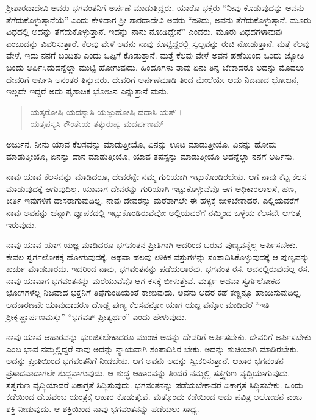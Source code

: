 ಶ್ರೀಶಾರದಾದೇವಿ ಅವರು ಭಗವಂತನಿಗೆ ಅರ್ಪಣೆ ಮಾಡುತ್ತಿದ್ದರು. ಯಾರೊ ಭಕ್ತರು “ನೀವು ಕೊಡುವುದನ್ನು ಅವನು ತೆಗೆದುಕೊಳ್ಳುತ್ತಾನೆಯೆ” ಎಂದು ಕೇಳಿದಾಗ ಶ್ರೀ ಶಾರದಾದೇವಿ ಅವರು “ಹೌದು, ಅವನು ತೆಗೆದುಕೊಳ್ಳುತ್ತಾನೆ. ಮೂರು ವಿಧದಲ್ಲಿ ಅದನ್ನು ತೆಗೆದುಕೊಳ್ಳುತ್ತಾನೆ. ಇದನ್ನು ನಾನು ನೋಡಿದ್ದೇನೆ” ಎಂದರು. ಮೂರು ವಿಧದಗಳಾವುವು ಎಂಬುದನ್ನು ವಿವರಿಸುತ್ತಾರೆ. ಕೆಲವು ವೇಳೆ ಅವನು ನಾವು ಕೊಟ್ಟಿದ್ದರಲ್ಲಿ ಸ್ವಲ್ಪವನ್ನು ರುಚಿ ನೋಡುತ್ತಾನೆ. ಮತ್ತೆ ಕೆಲವು ವೇಳೆ, ಇದು ನನಗೆ ಬಂದಿತು ಎಂದು ಒಪ್ಪಿಗೆ ಕೊಡುತ್ತಾನೆ. ಮತ್ತೆ ಕೆಲವು ವೇಳೆ ಅವನ ಹಣೆಯಿಂದ ಒಂದು ಜ್ಯೋತಿ ಬಂದು ಅರ್ಪಿಸಿದುದನ್ನೆಲ್ಲಾ ಮುಟ್ಟಿ ಹೋಗುವುದು. ಹಿಂದೂಗಳು ತಾವು ಏನು ತಿನ್ನ ಬೇಕಾದರೂ ಅದನ್ನು ಮೊದಲು ದೇವರಿಗೆ ಅರ್ಪಿಸಿ ಅನಂತರ ತಿನ್ನುವರು. ದೇವರಿಗೆ ಅರ್ಪಣೆಮಾಡಿ ತಿಂದ ಮೇಲೆಯೇ ಅದು ನಿಜವಾದ ಭೋಜನ, ಇಲ್ಲದೇ ಇದ್ದರೆ ಅದು ಪೈಶಾಚಿಕ ಭೋಜನ ಎನ್ನುತ್ತಾನೆ ಮನು.

\begin{verse}
ಯತ್ಕರೋಷಿ ಯದಶ್ನಾಸಿ ಯಜ್ಜುಹೋಷಿ ದದಾಸಿ ಯತ್ ।\\ಯತ್ತಪಸ್ಯಸಿ ಕೌಂತೇಯ ತತ್ಕುರುಷ್ವ ಮದರ್ಪಣಮ್ 
\end{verse}

{\small ಅರ್ಜುನ, ನೀನು ಯಾವ ಕೆಲಸವನ್ನು ಮಾಡುತ್ತೀಯೊ, ಏನನ್ನು ಊಟ ಮಾಡುತ್ತೀಯೊ, ಏನನ್ನು ಹೋಮ ಮಾಡುತ್ತೀಯೊ, ಏನನ್ನು ದಾನ ಮಾಡುತ್ತೀಯೊ, ಯಾವ ತಪಸ್ಸನ್ನು ಮಾಡುತ್ತೀಯೊ ಅದನ್ನೆಲ್ಲಾ ನನಗೆ ಅರ್ಪಿಸು.}

ನಾವು ಯಾವ ಕೆಲಸವನ್ನು ಮಾಡಿದರೂ, ದೇವರನ್ನೇ ನಮ್ಮ ಗುರಿಯಾಗಿ ಇಟ್ಟುಕೊಂಡಿರಬೇಕು. ಆಗ ನಾವು ಕೆಟ್ಟ ಕೆಲಸ ಮಾಡುವುದಕ್ಕೆ ಆಗುವುದಿಲ್ಲ. ಯಾವಾಗ ದೇವರನ್ನು ಗುರಿಯಾಗಿ ಇಟ್ಟುಕೊಳ್ಳುವೆವೊ ಆಗ ಅಧಿಕಾರಲಾಲಸೆ, ಹಣ, ಕೀರ್ತಿ ಇವುಗಳಿಗೆ ದಾಸರಾಗುವುದಿಲ್ಲ. ನಾವು ದೇವರನ್ನು ಮರೆತಾಗಲೇ ಈ ಹಳ್ಳಕ್ಕೆ ಬೀಳಬೇಕಾದರೆ. ಎಲ್ಲಿಯವರೆಗೆ ನಾವು ಅವನನ್ನು ಚೆನ್ನಾಗಿ ಜ್ಞಾಪಕದಲ್ಲಿ ಇಟ್ಟುಕೊಂಡಿರುವೆವೋ ಅಲ್ಲಿಯವರೆಗೆ ನಮ್ಮಿಂದ ಒಳ್ಳೆಯ ಕೆಲಸವೇ ಆಗುತ್ತ ಇರುವುದು.

ನಾವು ಯಾವ ಯಾಗ ಯಜ್ಞ ಮಾಡಿದರೂ ಭಗವಂತನ ಪ್ರೀತಿಗಾಗಿ ಅದರಿಂದ ಬರುವ ಪುಣ್ಯವನ್ನೆಲ್ಲ ಅರ್ಪಿಸಬೇಕು. ಕೇವಲ ಸ್ವರ್ಗಲೋಕಕ್ಕೆ ಹೋಗುವುದಕ್ಕೆ, ಅಥವಾ ಹಲವು ಲೌಕಿಕ ವಸ್ತುಗಳನ್ನು ಸಂಪಾದಿಸಿಕೊಳ್ಳುವುದಕ್ಕೆ ಆ ಪುಣ್ಯವನ್ನು ಖರ್ಚು ಮಾಡಬಾರದು. ಇದರಿಂದ ನಾವು, ಭಗವಂತನನ್ನು ಪಡೆಯಲಾರೆವು. ಭಗವಂತ ರಸ. ಅವನಲ್ಲಿರುವುದೆಲ್ಲ ರಸ. ನಾವು ಯಾವಾಗ ಭಗವಂತನನ್ನು ಮರೆಯುವೆವೊ ಆಗ ಕಸಕ್ಕೆ ಬೀಳುತ್ತೇವೆ. ಮರ್ತ್ಯ ಅಥವಾ ಸ್ವರ್ಗಲೋಕದ ಭೋಗಗಳೆಲ್ಲ ನಿಜವಾದ ಭಕ್ತನಿಗೆ ತಿಪ್ಪೆಗುಂಡಿಯಂತೆ ಕಾಣುವುದು. ಅವನು ಅದರ ಕಡೆ ಕಣ್ಣನ್ನೂ ಹಾಯಿಸುವುದಿಲ್ಲ. ಆದಕಾರಣವೇ ಯಾವುದಾದರೂ ದೊಡ್ಡ ಪುಣ್ಯ ಕೆಲಸವನ್ನೋ ಯಾಗ ಯಜ್ಞ ವನ್ನೋ ಮಾಡಿದರೆ “ಇತಿ ಶ್ರೀಕೃಷ್ಣಾರ್ಪಣಮಸ್ತು” “ಭಗವತ್ ಪ್ರೀತ್ಯರ್ಥಂ” ಎಂದು ಹೇಳುವುದು.

ನಾವು ಯಾವ ಆಹಾರವನ್ನು ಭುಂಜಿಸಬೇಕಾದರೂ ಮುಂಚೆ ಅದನ್ನು ದೇವರಿಗೆ ಅರ್ಪಿಸಬೇಕು. ದೇವರಿಗೆ ಅರ್ಪಿಸಬೇಕು ಎಂಬ ಭಾವ ನಮ್ಮಲ್ಲಿದ್ದರೆ ನಾವು ಅದನ್ನು ನ್ಯಾಯವಾಗಿ ಸಂಪಾದಿಸಿರ ಬೇಕು. ಅದನ್ನು ಶುಚಿಯಾಗಿ ಮಾಡಿರಬೇಕು. ಅದನ್ನು ಪ್ರೀತಿಯಿಂದ ಭಗವಂತನಿಗೆ ನೀಡಬೇಕು. ಆಗ ಅವನು ಅದನ್ನು ಸ್ವೀಕರಿಸುತ್ತಾನೆ. ಆಹಾರ ಭಗವಂತನ ಪ್ರಸಾದವಾದಾಗಲೇ ಶುದ್ಧವಾಗುವುದು. ಆ ಶುದ್ಧ ಆಹಾರವನ್ನು ತಿಂದರೆ ನಮ್ಮಲ್ಲಿ ಸತ್ತ್ವಗುಣ ವೃದ್ಧಿಯಾಗುವುದು. ಸತ್ವಗುಣ ವೃದ್ಧಿಯಾದರೆ ಏಕಾಗ್ರತೆ ಸಿದ್ಧಿಸುವುದು. ಭಗವಂತನನ್ನು ಪಡೆಯಬೇಕಾದರೆ ಏಕಾಗ್ರತೆ ಸಿದ್ಧಿಸಬೇಕು. ಒಂದು ಕಡೆಯಿಂದ ದೇಹವೆಂಬ ಯಂತ್ರಕ್ಕೆ ಆಹಾರ ಕೊಡುತ್ತೇವೆ. ಮತ್ತೊಂದು ಕಡೆಯಿಂದ ಅದು ಪವಿತ್ರ ಆಲೋಚನೆ ಎಂಬ ಶಕ್ತಿ ನೀಡುವುದು. ಆ ಶಕ್ತಿಯಿಂದ ನಾವು ಭಗವಂತನನ್ನು ಪಡೆಯಲು ಸಾಧ್ಯ.

